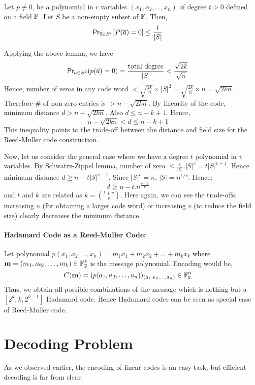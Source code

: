 \begin{lemma} Let $p \not \equiv 0$, be a polynomial in $r$ variables $(x_1,x_2,\ldots,x_n)$ of degree $t > 0$ defined on a field ${\mathbb{F}}$. Let $S$ be a non-empty subset of ${\mathbb{F}}$. Then,
\[ {\sf Pr}_{\overline{a} \in S^r} [P(\overline{a}) = 0]  \le \frac{t}{|S|} \] 
\end{lemma}

Applying the above lemma, we have
\[ {\sf Pr}_{a \in S^2} (p(\overline{a}) = 0) = \frac{\text{total
degree}}{|S|} < \frac{\sqrt{2k}}{\sqrt{n}} \]
Hence, number of zeros in any code word 
$< \sqrt{\frac{2k}{n}} \times |S|^2 = \sqrt{\frac{2k}{n}} \times n = \sqrt{2kn}$.
Therefore \# of non zero entries is $ > n - \sqrt{2kn}$. By linearity of the
code, minimum distance $d > n-\sqrt{2kn}$. Also $d \le n-k+1$. Hence,
\[ n-\sqrt{2kn} < d \le n-k+1\]
This inequality points to the trade-off between the distance and field
size for the Reed-Muller code construction.

Now, let us consider the general case where we have a degree $t$ polynomial in $v$ variables. By Schwatrz-Zippel lemma, number of zero $ \le \frac{t}{|S|}.|S|^v = t|S|^{v-1}$. Hence minimum distance $d \ge n-t|S|^{v-1}$. Since $|S|^v = n$, $|S| = n^{1/v}$. Hence:
\[ d \ge n-t.n^{\frac{v-1}{v}} \]
and $t$ and $k$ are related as $k=\binom{t+v}{v}$. Here
again, we can see the trade-offs: increasing $n$ (for obtaining a larger code word) or increasing $v$ (to reduce the field size) clearly decreases the minimum distance.

\paragraph{Hadamard Code as a Reed-Muller Code:}
Let polynomial $p(x_1,x_2,\ldots,x_n) = m_1x_1+m_2x_2+\ldots+m_kx_k$ where $\mathbf{m} = (m_1,m_2,\ldots,m_k) \in {\mathbb{F}}_2^k$ is the message polynomial. Encoding would be,
\[ C(\mathbf{m}) = (p(a_1,a_2,\ldots,a_n))_{(a_1,a_2,\ldots,a_n)}\in {\mathbb{F}}_2^n\]
Thus, we obtain all possible combinations of the message which is
nothing but a $[2^k,k,2^{k-1}]$ Hadamard code. Hence Hadamard codes can be seen as special case of Reed-Muller code.

\section{Decoding Problem}

As we observed earlier, the encoding of linear codes is an easy task, but efficient decoding is far from clear. 

